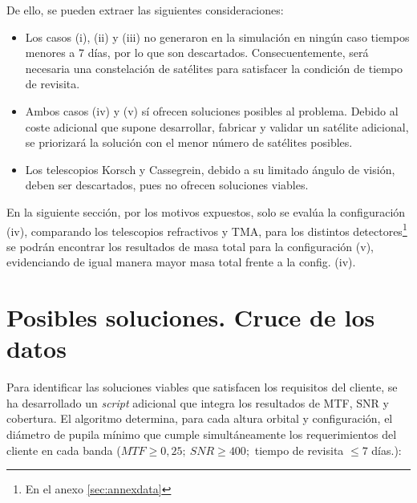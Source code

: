 De ello, se pueden extraer las siguientes consideraciones:
\begin{itemize}
    \item Los casos (i), (ii) y (iii) no generaron en la simulación en ningún caso tiempos menores a 7 días, por lo que son descartados. Consecuentemente, será necesaria una constelación de satélites para satisfacer la condición de tiempo de revisita.
    
    \item Ambos casos (iv) y (v) sí ofrecen soluciones posibles al problema. Debido al coste adicional que supone desarrollar, fabricar y validar un satélite adicional, se priorizará la solución con el menor número de satélites posibles.
    \item Los telescopios Korsch y Cassegrein, debido a su limitado ángulo de visión, deben ser descartados, pues no ofrecen soluciones viables.
\end{itemize}

En la siguiente sección, por los motivos expuestos, solo se evalúa la configuración (iv), comparando los telescopios refractivos y TMA, para los distintos detectores\footnote{En el anexo \ref{sec:annexdata}} se podrán encontrar los resultados de masa total para la configuración (v), evidenciando de igual manera mayor masa total frente a la config. (iv).


\section{Posibles soluciones. Cruce de los datos}

Para identificar las soluciones viables que satisfacen los requisitos del cliente, se ha desarrollado un \textit{script} adicional que integra los resultados de MTF, SNR y cobertura. El algoritmo determina, para cada altura orbital y configuración, el diámetro de pupila mínimo que cumple simultáneamente los requerimientos del cliente en cada banda ($MTF \geq 0,25;\ SNR \geq 400; $ tiempo de revisita $\leq 7$ días.):


